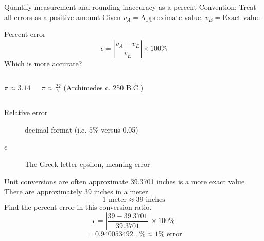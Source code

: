 \documentclass[onlytextwidth]{beamer}
\begin{document}
\begin{frame}{Quantify measurement and rounding inaccuracy as a percent}
    {Convention: Treat all errors as a positive amount}
    Given $v_A= \text{Approximate value}$, $v_E= \text{Exact value}$ \par \bigskip
    Percent error
    $$\epsilon = \left|\frac{v_A-v_E}{v_E}\right| \times 100\%$$
    \bigskip    
    Which is more accurate? %
        \begin{columns}
                $\pi \approx 3.14$ \par \bigskip
                $\pi \approx \frac{22}{7}$ (\href{https://en.wikipedia.org/wiki/Archimedes}{Archimedes c. 250 B.C.}) \par \medskip
        \end{columns}  \vspace{0.5cm}
        \begin{description}
            \item[Relative error] decimal format (i.e. $5\%$ versus 0.05)
            \item[$\epsilon$] The Greek letter epsilon, meaning error
        \end{description}
    \end{frame}
    
\begin{frame}{Unit conversions are often approximate}
    {39.3701 inches is a more exact value}
    There are approximately 39 inches in a meter.
    $$ 1 \text{ meter} \approx 39 \text{ inches}$$
    Find the percent error in this conversion ratio. \vspace{1cm}
    $$\epsilon = \left|\frac{39-39.3701}{39.3701}\right| \times 100\%$$
    $$=0.940053492...\% \approx 1\% \text{ error}$$
    \end{frame}
\end{document}
